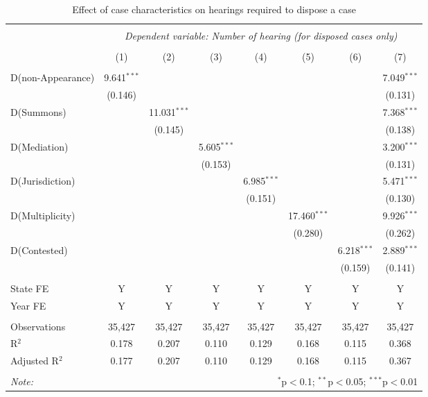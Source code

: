 \documentclass[12pt,a4paper]{article}
\begin{document}
	\begin{table}[!ht]
		\caption{Effect of case characteristics on hearings required to dispose a case} \label{tab:hearings_regression}
		\footnotesize
		\centering
	\begin{tabular}{lccccccc}
			\\[-1.8ex]
			\hline \\[-1.8ex] 
			& \multicolumn{7}{c}{\textit{Dependent variable: Number of hearing (for disposed cases only)}} \\ 
			\cline{2-8} 
			\\[-1.8ex] & (1) & (2) & (3) & (4) & (5) & (6) & (7)\\ 
			\hline \\[-1.8ex]
			D(non-Appearance) & 9.641$^{***}$ & & & & & & 7.049$^{***}$ \\ 
			& (0.146) & & & & & & (0.131) \\ 
			D(Summons) & & 11.031$^{***}$ & & & & & 7.368$^{***}$ \\ 
			& & (0.145) & & & & & (0.138) \\ 
			D(Mediation) & & & 5.605$^{***}$ & & & & 3.200$^{***}$ \\ 
			& & & (0.153) & & & & (0.131) \\ 
			D(Jurisdiction) & & & & 6.985$^{***}$ & & & 5.471$^{***}$ \\ 
			& & & & (0.151) & & & (0.130) \\ 
			D(Multiplicity) & & & & & 17.460$^{***}$ & & 9.926$^{***}$ \\ 
			& & & & & (0.280) & & (0.262) \\ 
			D(Contested) & & & & & & 6.218$^{***}$ & 2.889$^{***}$ \\ 
			& & & & & & (0.159) & (0.141) \\ 
			\hline \\[-1.8ex]
			State FE & Y & Y & Y & Y & Y & Y & Y \\ 
			Year FE & Y & Y & Y & Y & Y & Y & Y \\ 
			\hline \\[-1.8ex] 
			Observations & 35,427 & 35,427 & 35,427 & 35,427 & 35,427 & 35,427 & 35,427 \\ 
			R$^{2}$ & 0.178 & 0.207 & 0.110 & 0.129 & 0.168 & 0.115 & 0.368 \\ 
			Adjusted R$^{2}$ & 0.177 & 0.207 & 0.110 & 0.129 & 0.168 & 0.115 & 0.367 \\ 
			\hline \\[-1.8ex] 
			\textit{Note:} & \multicolumn{7}{r}{$^{*}$p$<$0.1; $^{**}$p$<$0.05; $^{***}$p$<$0.01} \\ 
	\end{tabular}
\end{table}
	
\end{document}
